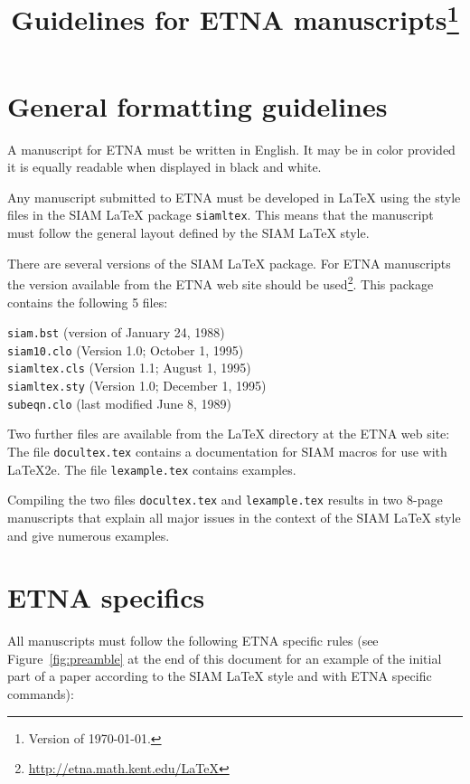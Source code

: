 \documentclass[parskip]{scrartcl}
\title{Guidelines for ETNA manuscripts\footnote{Version of \today.}}
\date{}
\begin{document}
\maketitle

\section{General formatting guidelines}

A manuscript for ETNA must be written in English. It may be in color provided
it is equally readable when displayed in black and white.

Any manuscript submitted to ETNA must be developed in {\LaTeX} using the style
files in the SIAM {\LaTeX} package \texttt{siamltex}.  This means that the
manuscript must follow the general layout defined by the SIAM {\LaTeX} style.

There are several versions of the SIAM {\LaTeX} package. For ETNA manuscripts
the version available from the ETNA web site should be
used\footnote{\url{http://etna.math.kent.edu/LaTeX}}. This package contains the
following 5 files:

\texttt{siam.bst} (version of January 24, 1988)\\
\texttt{siam10.clo} (Version 1.0; October 1, 1995)\\
\texttt{siamltex.cls} (Version 1.1; August 1, 1995)\\
\texttt{siamltex.sty} (Version 1.0; December 1, 1995)\\
\texttt{subeqn.clo} (last modified June 8, 1989)

Two further files are available from the {\LaTeX} directory at the ETNA web
site: The file \texttt{docultex.tex} contains a documentation for SIAM macros
for use with {\LaTeX}2e. The file \texttt{lexample.tex} contains examples.

Compiling the two files \texttt{docultex.tex} and \texttt{lexample.tex} results
in two 8-page manuscripts that explain all major issues in the context of the
SIAM {\LaTeX} style and give numerous examples.

\section{ETNA specifics}
All manuscripts must follow the following ETNA specific rules (see
Figure~\ref{fig:preamble} at the end of this document for an example of the
initial part of a paper according to the SIAM {\LaTeX} style and with ETNA
specific commands):
\end{document}
